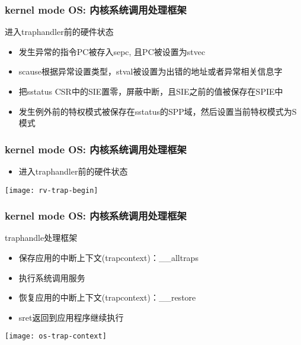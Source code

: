 \begin{frame}
    \frametitle{kernel mode OS: 内核系统调用处理框架}
    进入trap\-handler前的硬件状态
    \begin{itemize}
        
    \item 发生异常的指令PC被存入sepc, 且PC被设置为stvec
    \item scause根据异常设置类型，stval被设置为出错的地址或者异常相关信息字
    \item 把sstatus CSR中的SIE置零，屏蔽中断，且SIE之前的值被保存在SPIE中
    \item 发生例外前的特权模式被保存在sstatus的SPP域，然后设置当前特权模式为S模式
        
    \end{itemize}	
\end{frame}

\begin{frame}
    \frametitle{kernel mode OS: 内核系统调用处理框架}
    
    \begin{itemize}
        
        \item 进入trap\-handler前的硬件状态
        
        
    \end{itemize}	
    \centering
    \texttt{[image: rv-trap-begin]}
\end{frame}

\begin{frame}
    \frametitle{kernel mode OS: 内核系统调用处理框架}
    trap\-handle处理框架
    \begin{itemize}
        
        \item 保存应用的中断上下文(trap\-context)：\_\_alltraps
        \item 执行系统调用服务
        \item 恢复应用的中断上下文(trap\-context)：\_\_restore
        \item sret返回到应用程序继续执行
    \end{itemize}	
    \centering
    \texttt{[image: os-trap-context]}
\end{frame}

